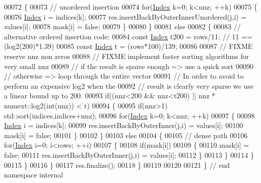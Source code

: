 \begin{DoxyCode}
00072     \{
00073       \textcolor{comment}{// unordered insertion}
00074       \textcolor{keywordflow}{for}(\hyperlink{namespace_eigen_a62e77e0933482dafde8fe197d9a2cfde}{Index} k=0; k<nnz; ++k)
00075       \{
00076         \hyperlink{namespace_eigen_a62e77e0933482dafde8fe197d9a2cfde}{Index} i = indices[k];
00077         res.insertBackByOuterInnerUnordered(j,i) = values[i];
00078         mask[i] = \textcolor{keyword}{false};
00079       \}
00080     \}
00081     \textcolor{keywordflow}{else}
00082     \{
00083       \textcolor{comment}{// alternative ordered insertion code:}
00084       \textcolor{keyword}{const} \hyperlink{namespace_eigen_a62e77e0933482dafde8fe197d9a2cfde}{Index} t200 = rows/11; \textcolor{comment}{// 11 == (log2(200)*1.39)}
00085       \textcolor{keyword}{const} \hyperlink{namespace_eigen_a62e77e0933482dafde8fe197d9a2cfde}{Index} t = (rows*100)/139;
00086 
00087       \textcolor{comment}{// FIXME reserve nnz non zeros}
00088       \textcolor{comment}{// FIXME implement faster sorting algorithms for very small nnz}
00089       \textcolor{comment}{// if the result is sparse enough => use a quick sort}
00090       \textcolor{comment}{// otherwise => loop through the entire vector}
00091       \textcolor{comment}{// In order to avoid to perform an expensive log2 when the}
00092       \textcolor{comment}{// result is clearly very sparse we use a linear bound up to 200.}
00093       \textcolor{keywordflow}{if}((nnz<200 && nnz<t200) || nnz * numext::log2(\textcolor{keywordtype}{int}(nnz)) < t)
00094       \{
00095         \textcolor{keywordflow}{if}(nnz>1) std::sort(indices,indices+nnz);
00096         \textcolor{keywordflow}{for}(\hyperlink{namespace_eigen_a62e77e0933482dafde8fe197d9a2cfde}{Index} k=0; k<nnz; ++k)
00097         \{
00098           \hyperlink{namespace_eigen_a62e77e0933482dafde8fe197d9a2cfde}{Index} i = indices[k];
00099           res.insertBackByOuterInner(j,i) = values[i];
00100           mask[i] = \textcolor{keyword}{false};
00101         \}
00102       \}
00103       \textcolor{keywordflow}{else}
00104       \{
00105         \textcolor{comment}{// dense path}
00106         \textcolor{keywordflow}{for}(\hyperlink{namespace_eigen_a62e77e0933482dafde8fe197d9a2cfde}{Index} i=0; i<rows; ++i)
00107         \{
00108           \textcolor{keywordflow}{if}(mask[i])
00109           \{
00110             mask[i] = \textcolor{keyword}{false};
00111             res.insertBackByOuterInner(j,i) = values[i];
00112           \}
00113         \}
00114       \}
00115     \}
00116   \}
00117   res.finalize();
00118 \}
00119 
00120 
00121 \} \textcolor{comment}{// end namespace internal}

\end{DoxyCode}
